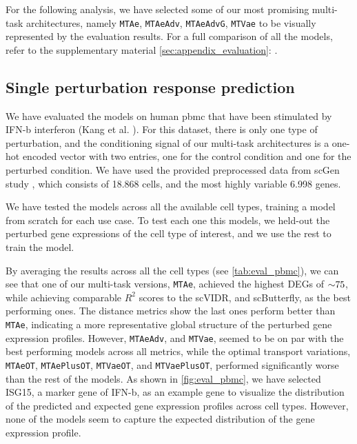 \documentclass[12pt, a4paper]{article}
\newcommand{\crefwithname}[1]{\cref{#1}: \nameref{#1}}
\begin{document}
For the following analysis, we have selected some of our most promising multi-task architectures, namely \verb|MTAe|, \verb|MTAeAdv|, \verb|MTAeAdvG|, \verb|MTVae| to be visually represented by the evaluation results. For a full comparison of all the models, refer to the supplementary material \crefwithname{sec:appendix_evaluation}. 

\subsection{Single perturbation response prediction}
\label{sec:eval_single_perturbation}

We have evaluated the models on human \gls{pbmc} that have been stimulated by IFN-b interferon (Kang et al. \cite{kanaGenerativeModelingSinglecell2023}). For this dataset, there is only one type of perturbation, and the conditioning signal of our multi-task architectures is a one-hot encoded vector with two entries, one for the control condition and one for the perturbed condition. We have used the provided preprocessed data from scGen study \cite{lotfollahiScGenPredictsSinglecell2019}, which consists of 18.868 cells, and the most highly variable 6.998 genes.

We have tested the models across all the available cell types, training a model from scratch for each use case. To test each one this models, we held-out the perturbed gene expressions of the cell type of interest, and we use the rest to train the model. 

By averaging the results across all the cell types (see \cref{tab:eval_pbmc}), we can see that one of our multi-task versions, \verb|MTAe|, achieved the highest DEGs of $\small{\sim} 75$, while achieving comparable $R^2$ scores to the scVIDR, and scButterfly, as the best performing ones.  The distance metrics show the last ones perform better than \verb|MTAe|, indicating a more representative global structure of the perturbed gene expression profiles. However, \verb|MTAeAdv|, and \verb|MTVae|, seemed to be on par with the best performing models across all metrics, while the optimal transport variations, \verb|MTAeOT|, \verb|MTAePlusOT|, \verb|MTVaeOT|, and \verb|MTVaePlusOT|, performed significantly worse than the rest of the models.
As shown in \cref{fig:eval_pbmc}, we have selected ISG15, a marker gene of IFN-b, as an example gene to visualize the distribution of the predicted and expected gene expression profiles across cell types. However, none of the models seem to capture the expected distribution of the gene expression profile.
\end{document}
